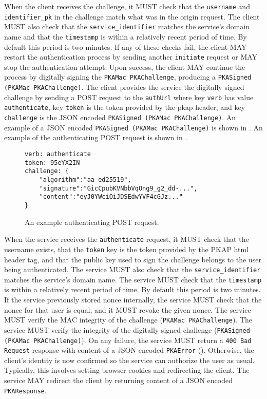 \documentclass{article}
\newcommand{\pkap}{PKAP}
\begin{document}

When the client receives the challenge, it MUST check that the \texttt{username} and \texttt{identifier\_pk} in the challenge match what was in the origin request. 
The client MUST also check that the \texttt{service\_identifier} matches the service's domain name and that the \texttt{timestamp} is within a relatively recent period of time. 
By default this period is two minutes. 
If any of these checks fail, the client MAY restart the authentication process by sending another \texttt{initiate} request or MAY stop the authentication attempt. 
Upon success, the client MAY continue the process by digitally signing the \texttt{PKAMac PKAChallenge}, producing a \texttt{PKASigned (PKAMac PKAChallenge)}. 
The client provides the service the digitally signed challenge by sending a POST request to the \texttt{authUrl} where key \texttt{verb} has value \texttt{authenticate}, key \texttt{token} is the token provided by the pkap header, and key \texttt{challenge} is the JSON encoded \texttt{PKASigned (PKAMac PKAChallenge)}. 
An example of a JSON encoded \texttt{PKASigned (PKAMac PKAChallenge)} is shown in . 
An example of the authenticating POST request is shown in . 

\begin{figure}
\begin{lstlisting}
verb: authenticate
token: 95eYX2IN
challenge: {
    "algorithm":"aa-ed25519",
    "signature":"GicCpubKVNbbVqOng9_g2_dd-...",
    "content":"eyJ0YWciOiJDSEdwYVF4cGJz..."
}
\end{lstlisting}
\caption{An example authenticating POST request.}
\label{code:postauthenticate}
\end{figure}

When the service receives the \texttt{authenticate} request, it MUST check that the username exists, that the \texttt{token} key is the token provided by the \pkap{} html header tag,  and that the public key used to sign the challenge belongs to the user being authenticated. 
The service MUST also check that the \texttt{service\_identifier} matches the service's domain name. 
The service MUST check that the \texttt{timestamp} is within a relatively recent period of time. 
By default this period is two minutes. 
If the service previously stored nonce internally, the service MUST check that the nonce for that user is equal, and it MUST revoke the given nonce. 
The service MUST verify the MAC integrity of the challenge (\texttt{PKAMac PKAChallenge}). 
The service MUST verify the integrity of the digitally signed challenge (\texttt{PKASigned (PKAMac PKAChallenge)}). 
On any failure, the service MUST return a \texttt{400 Bad Request} response with content of a JSON encoded \texttt{PKAError} (). 
Otherwise, the client's identity is now confirmed so the service can authorize the user as usual. 
Typically, this involves setting browser cookies and redirecting the client. 
The service MAY redirect the client by returning content of a JSON encoded \texttt{PKAResponse}. 
\end{document}

